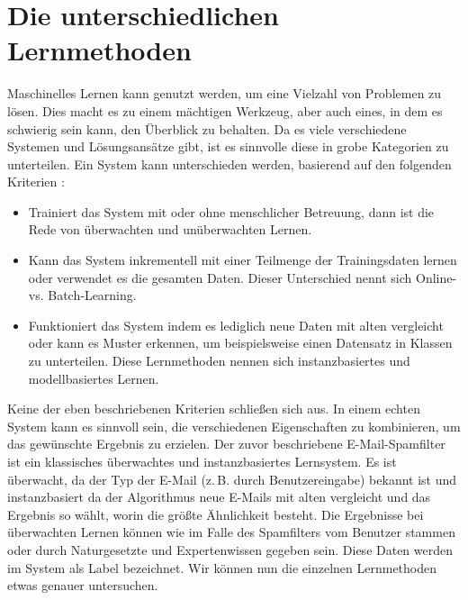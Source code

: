 \section{Die unterschiedlichen Lernmethoden}
Maschinelles Lernen kann genutzt werden, um eine Vielzahl von Problemen zu lösen.
Dies macht es zu einem mächtigen Werkzeug, aber auch eines, in dem es schwierig sein
kann, den Überblick zu behalten.
Da es viele verschiedene Systemen und Lösungsansätze gibt, ist es sinnvolle
diese in grobe Kategorien zu unterteilen.
Ein System kann unterschieden werden, basierend auf den folgenden
Kriterien \parencite[7]{book:hands-on-ml}:
\begin{itemize}
  \item Trainiert das System mit oder ohne menschlicher Betreuung, dann ist
        die Rede von überwachten und unüberwachten Lernen.
  \item Kann das System inkrementell mit einer Teilmenge der Trainingsdaten
        lernen oder verwendet es die gesamten Daten. Dieser Unterschied
        nennt sich Online- vs. Batch-Learning.
  \item Funktioniert das System indem es lediglich neue Daten mit
        alten vergleicht oder kann es Muster erkennen, um beispielsweise
        einen Datensatz in Klassen zu unterteilen.
        Diese Lernmethoden nennen sich instanzbasiertes und modellbasiertes Lernen.
\end{itemize}
Keine der eben beschriebenen Kriterien schließen sich aus.
In einem echten System kann es sinnvoll sein, die verschiedenen
Eigenschaften zu kombinieren, um das gewünschte Ergebnis
zu erzielen. Der zuvor beschriebene E-Mail-Spamfilter
ist ein klassisches überwachtes und instanzbasiertes Lernsystem.
Es ist überwacht, da der Typ der E-Mail (z.\,B. durch Benutzereingabe)
bekannt ist und instanzbasiert da
der Algorithmus neue E-Mails mit alten vergleicht und das
Ergebnis so wählt, worin die größte Ähnlichkeit besteht.
Die Ergebnisse bei überwachten Lernen können wie im Falle des
Spamfilters vom Benutzer stammen oder durch Naturgesetzte und Expertenwissen
gegeben sein. Diese Daten werden im System als Label bezeichnet.
Wir können nun die einzelnen Lernmethoden etwas genauer untersuchen.

